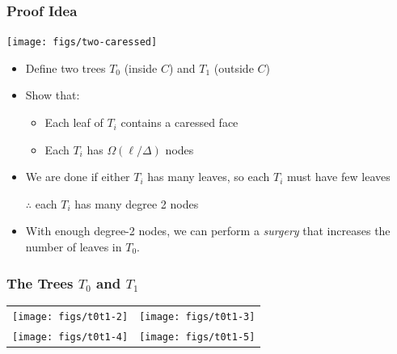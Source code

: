 \documentclass[xcolor=dvipsnames]{beamer}
\begin{document}
\begin{frame}
  \frametitle{Proof Idea}

  \begin{center}
     \texttt{[image: figs/two-caressed]}
  \end{center}
  \begin{itemize}
    \item Define two trees $T_0$ (inside $C$) and $T_1$ (outside $C$)
    \item Show that:
    \begin{itemize}
      \item Each leaf of $T_i$ contains a caressed face
      \item Each $T_i$ has $\Omega(\ell/\Delta)$ nodes
    \end{itemize}
    \item We are done if either $T_i$ has many leaves, so each $T_i$ must have few leaves
    \item[$\therefore$] each $T_i$ has many degree 2 nodes
    \item With enough degree-2 nodes, we can perform a \emph{surgery} that increases the number of leaves in $T_0$.
  \end{itemize}
\end{frame}


\begin{frame}
  \frametitle{The Trees $T_0$ and $T_1$}

  \begin{center}
   \begin{tabular}{cc}
      \texttt{[image: figs/t0t1-2]} &
      \texttt{[image: figs/t0t1-3]} \\
      \texttt{[image: figs/t0t1-4]} & 
      \texttt{[image: figs/t0t1-5]} \\
   \end{tabular}
  \end{center} 
\end{frame}


%
\end{document}
